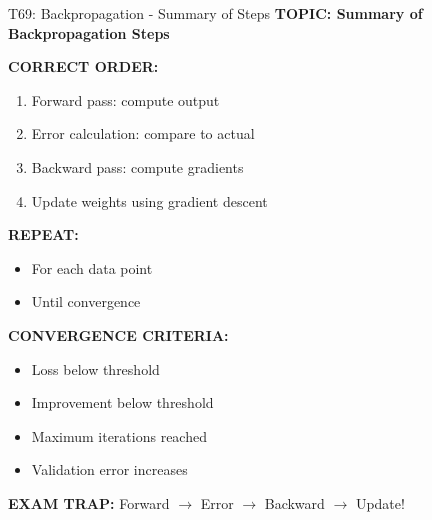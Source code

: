 \documentclass[8pt]{beamer}
\begin{document}
	\begin{frame}{T69: Backpropagation - Summary of Steps}
		\fontsize{6.5}{7.5}\selectfont
		\textbf{TOPIC: Summary of Backpropagation Steps}
		
		\vspace{0.1cm}
		\textbf{CORRECT ORDER:}
		\begin{enumerate}
			\item Forward pass: compute output
			\item Error calculation: compare to actual
			\item Backward pass: compute gradients
			\item Update weights using gradient descent
		\end{enumerate}
		
		\vspace{0.1cm}
		\textbf{REPEAT:}
		\begin{itemize}
			\item For each data point
			\item Until convergence
		\end{itemize}
		
		\vspace{0.1cm}
		\textbf{CONVERGENCE CRITERIA:}
		\begin{itemize}
			\item Loss below threshold
			\item Improvement below threshold
			\item Maximum iterations reached
			\item Validation error increases
		\end{itemize}
		
		\textcolor{myred}{\textbf{EXAM TRAP:}} Forward $\to$ Error $\to$ Backward $\to$ Update!
	\end{frame}
	
\end{document}

